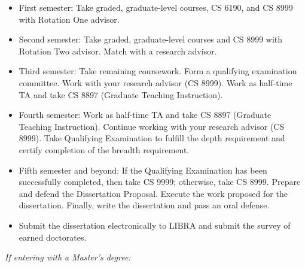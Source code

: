 \begin{itemize}[nosep]
\item
  First semester: Take graded, graduate-level courses, CS 6190, and CS
  8999 with Rotation One advisor.
\item
  Second semester: Take graded, graduate-level courses and CS 8999 with
  Rotation Two advisor. Match with a research advisor.
\item
  Third semester: Take remaining coursework. Form a qualifying
  examination committee. Work with your research advisor
  (CS 8999). Work as half-time TA and take CS 8897 (Graduate Teaching
  Instruction).
\item
  Fourth semester: Work as half-time TA and take CS 8897 (Graduate
  Teaching Instruction). Continue working with your research advisor (CS
  8999). Take Qualifying Examination to fulfill the depth requirement and
  certify completion of the breadth requirement.
\item
  Fifth semester and beyond: If the Qualifying Examination has been
  successfully completed, then take CS 9999; otherwise, take CS 8999.
  Prepare and defend the Dissertation Proposal. Execute the work
  proposed for the dissertation. Finally, write the dissertation and
  pass an oral defense.
\item
  Submit the dissertation electronically to LIBRA and submit the survey of
  earned doctorates.
\end{itemize}

\emph{If entering with a Master's degree:}

